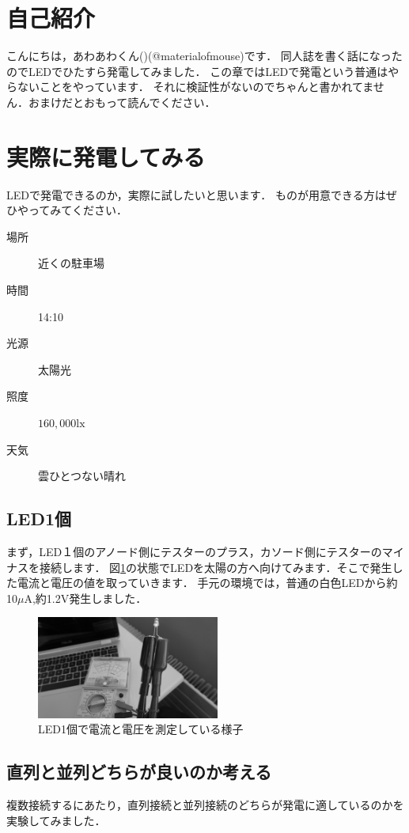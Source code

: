 \section{自己紹介}
こんにちは，あわあわくん()(@materialofmouse)です．
同人誌を書く話になったのでLEDでひたすら発電してみました．
この章ではLEDで発電という普通はやらないことをやっています．
それに検証性がないのでちゃんと書かれてません．おまけだとおもって読んでください．

\section{実際に発電してみる}
LEDで発電できるのか，実際に試したいと思います．
ものが用意できる方はぜひやってみてください．

\begin{description}
  \item[場所]{近くの駐車場}
  \item[時間]{14:10}
  \item[光源]{太陽光}
  \item[照度]{$160,000\si\lux$}
  \item[天気]{雲ひとつない晴れ}
\end{description}


\subsection{LED1個}
まず，LED１個のアノード側にテスターのプラス，カソード側にテスターのマイナスを接続します．
図\ref{fig:led1}の状態でLEDを太陽の方へ向けてみます．そこで発生した電流と電圧の値を取っていきます．
手元の環境では，普通の白色LEDから約10$\mu\si\ampere$,約1.2$\si\volt$発生しました．

\begin{figure}[htbp]
    \centering
    \includegraphics[width=60mm]{./assets/mouse/gray/1.JPG}
    \caption{LED1個で電流と電圧を測定している様子}
    \label{fig:led1}
\end{figure}

\subsection{直列と並列どちらが良いのか考える}
複数接続するにあたり，直列接続と並列接続のどちらが発電に適しているのかを実験してみました．

